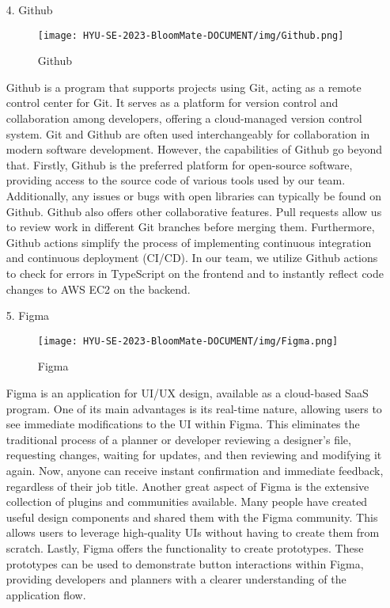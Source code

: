 \documentclass[conference, a4paper]{IEEEtran}
\begin{document}
\begin{enumerate}
    \item[4.]Github
    \begin{figure}[h]
    \centering
    \texttt{[image: HYU-SE-2023-BloomMate-DOCUMENT/img/Github.png]}
    \label{fig:Github}
    \caption{Github} 
    \end{figure}
    \item[]Github is a program that supports projects using Git, acting as a remote control center for Git. It serves as a platform for version control and collaboration among developers, offering a cloud-managed version control system. Git and Github are often used interchangeably for collaboration in modern software development. However, the capabilities of Github go beyond that. Firstly, Github is the preferred platform for open-source software, providing access to the source code of various tools used by our team. Additionally, any issues or bugs with open libraries can typically be found on Github. Github also offers other collaborative features. Pull requests allow us to review work in different Git branches before merging them. Furthermore, Github actions simplify the process of implementing continuous integration and continuous deployment (CI/CD). In our team, we utilize Github actions to check for errors in TypeScript on the frontend and to instantly reflect code changes to AWS EC2 on the backend.\\


    \item[5.]Figma
    \begin{figure}[h]
    \centering
    \texttt{[image: HYU-SE-2023-BloomMate-DOCUMENT/img/Figma.png]}
    \label{fig:Figma}
    \caption{Figma} 
    \end{figure}
    \item[]Figma is an application for UI/UX design, available as a cloud-based SaaS program. One of its main advantages is its real-time nature, allowing users to see immediate modifications to the UI within Figma. This eliminates the traditional process of a planner or developer reviewing a designer's file, requesting changes, waiting for updates, and then reviewing and modifying it again. Now, anyone can receive instant confirmation and immediate feedback, regardless of their job title. Another great aspect of Figma is the extensive collection of plugins and communities available. Many people have created useful design components and shared them with the Figma community. This allows users to leverage high-quality UIs without having to create them from scratch. Lastly, Figma offers the functionality to create prototypes. These prototypes can be used to demonstrate button interactions within Figma, providing developers and planners with a clearer understanding of the application flow.\\



\end{enumerate}
\end{document}
